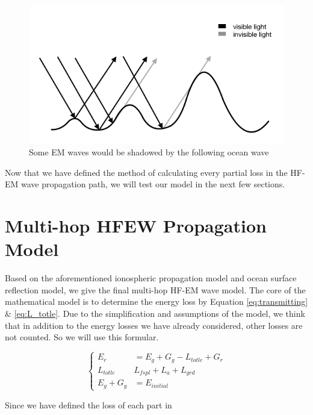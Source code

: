 \documentclass{mcmthesis}
\begin{document}
    \begin{figure}[ht]
      \centering
      \includegraphics[scale=0.5]{Visible}
      \caption{Some EM waves would be shadowed by the following ocean wave}
      \label{fig:visible}
    \end{figure}

    Now that we have defined the method of calculating every partial loss in the HF-EM wave propagation path, we will test our model in the next few sections.

\section{Multi-hop HFEW Propagation Model}

    Based on the aforementioned ionospheric propagation model and ocean surface reflection model, we give the final multi-hop HF-EM wave model. The core of the mathematical model is to determine the energy loss by Equation \ref{eq:transmitting} \& \ref{eq:L_totle}. Due to the simplification and assumptions of the model, we think that in addition to the energy losses we have already considered, other losses are not counted. So we will use this formular.

    \begin{equation}\label{eq:L_finaluse}
    \left\{
    \begin{aligned}
        E_{r} &= E_{g} + G_{g} - L_{totle} + G_{r} \\
        L_{totle} & L_{fspl} + L_{a} + L_{grd} \\
        E_{g} + G_{g} &= E_{initial}
    \end{aligned}
    \right.
    \end{equation}

    Since we have defined the loss of each part in
\end{document}
